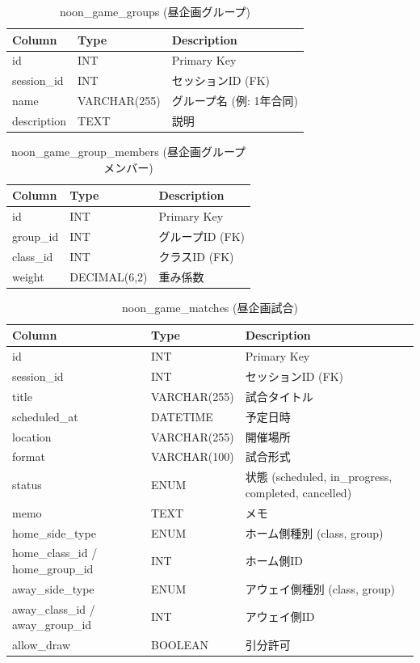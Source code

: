 \documentclass[paper=a4, fontsize=11pt]{jlreq}
\begin{document}
\begin{table}[H]
    \centering
    \caption{noon\_game\_groups (昼企画グループ)}
    \begin{tabularx}{\textwidth}{|l|l|X|}
        \toprule
        Column & Type & Description \\
        \midrule
        id & INT & Primary Key \\
        session\_id & INT & セッションID (FK) \\
        name & VARCHAR(255) & グループ名 (例: 1年合同) \\
        description & TEXT & 説明 \\
        \bottomrule
    \end{tabularx}
\end{table}

\begin{table}[H]
    \centering
    \caption{noon\_game\_group\_members (昼企画グループメンバー)}
    \begin{tabularx}{\textwidth}{|l|l|X|}
        \toprule
        Column & Type & Description \\
        \midrule
        id & INT & Primary Key \\
        group\_id & INT & グループID (FK) \\
        class\_id & INT & クラスID (FK) \\
        weight & DECIMAL(6,2) & 重み係数 \\
        \bottomrule
    \end{tabularx}
\end{table}

\begin{table}[H]
    \centering
    \caption{noon\_game\_matches (昼企画試合)}
    \begin{tabularx}{\textwidth}{|l|l|X|}
        \toprule
        Column & Type & Description \\
        \midrule
        id & INT & Primary Key \\
        session\_id & INT & セッションID (FK) \\
        title & VARCHAR(255) & 試合タイトル \\
        scheduled\_at & DATETIME & 予定日時 \\
        location & VARCHAR(255) & 開催場所 \\
        format & VARCHAR(100) & 試合形式 \\
        status & ENUM & 状態 (scheduled, in\_progress, completed, cancelled) \\
        memo & TEXT & メモ \\
        home\_side\_type & ENUM & ホーム側種別 (class, group) \\
        home\_class\_id / home\_group\_id & INT & ホーム側ID \\
        away\_side\_type & ENUM & アウェイ側種別 (class, group) \\
        away\_class\_id / away\_group\_id & INT & アウェイ側ID \\
        allow\_draw & BOOLEAN & 引分許可 \\
        \bottomrule
    \end{tabularx}
\end{table}
\end{document}
